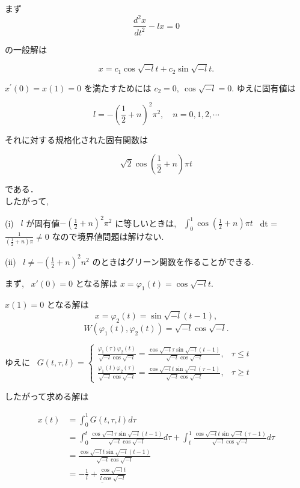 \documentclass{jsarticle}
\begin{document}
まず
$$
\frac{d^{2} x}{d t^{2}}-l x=0
$$

の一般解は

$$
x=c_{1} \cos \sqrt{-l}t + c_{2} \sin \sqrt{-l}t .
$$

$x^{\prime}(0)=x(1)=0$ を満たすためには $c_{2}=0, \ \cos \sqrt{-l}=0$. ゆえに固有値は

$$
l = -\left(\frac{1}{2}+n\right)^{2} \pi^{2}, \quad n=0,1,2, \cdots
$$

それに対する規格化された固有関数は

$$
\sqrt{2} \cos \left(\frac{1}{2}+n\right) \pi t
$$

である．\\
したがって, 

(i) \ $l$ が固有値$-\left(\frac{1}{2}+n\right)^{2} \pi^{2}$ に等しいときは, \ 
$\int_0^1 \cos\left(\frac{1}{2} + n \right) \pi t$ \ dt = $\frac{1}{(\frac{1}{2} + n)\pi} \neq 0$ なので境界値問題は解けない.

(ii) \ $l \neq -\left(\frac{1}{2} + n \right)^2 n^2$ のときはグリーン関数を作ることができる.

まず, \ $x'(0) = 0$ となる解は $x = \varphi_1(t) = \cos\sqrt{-l}t$.

$x(1) = 0$ となる解は
$$
x = \varphi_2(t) = \sin\sqrt{-l}(t-1),
$$
$$
W(\varphi_1(t), \varphi_2(t)) = \sqrt{-l}\cos\sqrt{-l}.
$$

ゆえに \ 
$G(t, \tau, l) = \begin{cases}
\frac{\varphi_1(\tau)\varphi_2(t)}{\sqrt{-l}\cos\sqrt{-l}} = \frac{\cos\sqrt{-l}\tau\sin\sqrt{-l}(t-1)}{\sqrt{-l}\cos\sqrt{-l}}, & \tau \le t \\
\frac{\varphi_1(t)\varphi_2(\tau)}{\sqrt{-l}\cos\sqrt{-l}} = \frac{\cos\sqrt{-l}t\sin\sqrt{-l}(\tau - 1)}{\sqrt{-l}\cos\sqrt{-l}}, & \tau \ge t
\end{cases}$

したがって求める解は

$$
\begin{aligned}
x(t)
&= \int_0^1 G(t, \tau, l) d\tau \\
&= \int_0^t \frac{\cos\sqrt{-l}\tau\sin\sqrt{-l}(t-1)}{\sqrt{-l}\cos\sqrt{-l}} d\tau + \int_t^1 \frac{\cos\sqrt{-l}t\sin\sqrt{-l}(\tau - 1)}{\sqrt{-l}\cos\sqrt{-l}} d\tau \\
&=\frac{\cos\sqrt{-l}t\sin\sqrt{-l}(t - 1)}{\sqrt{-l}\cos\sqrt{-l}} \\
&= \underline{-\frac{1}{l} + \frac{\cos\sqrt{-l}t}{l\cos\sqrt{-l}}}
\end{aligned}
$$
\end{document}
